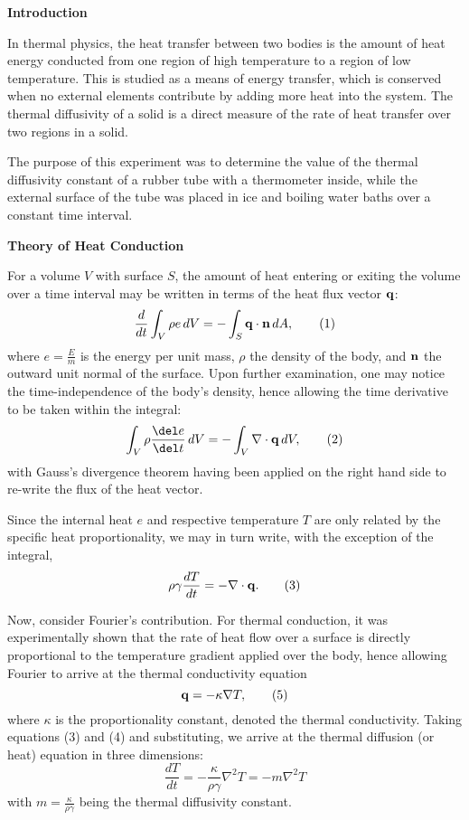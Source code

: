 \documentclass[11pt]{article}
\begin{document}
\begin{multicols}{2}


     \selectfont \textbf{Introduction}
    
     \selectfont 
    
    In thermal physics, the heat transfer between two bodies is the amount of heat energy conducted from one region of high temperature to a region of low temperature. This is studied as a means of energy transfer, which is conserved when no external elements contribute by adding more heat into the system. The thermal diffusivity of a solid is a direct measure of the rate of heat transfer over two regions in a solid.
    
    The purpose of this experiment was to determine the value of the thermal diffusivity constant of a rubber tube with a thermometer inside, while the external surface of the tube was placed in ice and boiling water baths over a constant time interval.  




    \vspace{10pt}

     \selectfont \textbf{Theory of Heat Conduction}
    
     \selectfont 
     

    For a volume $V$ with surface $S$, the amount of heat entering or exiting the volume over a time interval may be written in terms of the heat flux vector ${\bf{q}}$:
    \[
        \frac{d}{dt}\int_V \rho e\, dV = -\int_S {\bf{q}}\cdot {\bf{n}}\, dA,  \tag{1} 
    \]
    \nd where $e = \frac{E}{m}$ is the energy per unit mass, $\rho$ the density of the body, and ${\bf{n}}$ the outward unit normal of the surface. Upon further examination, one may notice the time-independence of the body's density, hence allowing the time derivative to be taken within the integral: 
    \[
        \int_V \rho \frac{\del e}{\del t}\, dV = -\int_V\nabla\cdot {\bf{q}}\, dV,  \tag{2}
    \]
    \nd with Gauss's divergence theorem having been applied on the right hand side to re-write the flux of the heat vector.

    Since the internal heat $e$ and respective temperature $T$ are only related by the specific heat proportionality, we may in turn write, with the exception of the integral, 
    \[
        \rho \gamma \frac{dT}{dt} = -\nabla \cdot {\bf{q}}. \tag{3}  
    \]

    Now, consider Fourier's contribution. For thermal conduction, it was experimentally shown that the rate of heat flow over a surface is directly proportional to the temperature gradient applied over the body, hence allowing Fourier to arrive at the thermal conductivity equation 
    \[
        {\bf{q}} = -\kappa \nabla T, \tag{5}
    \]
    \nd where $\kappa$ is the proportionality constant, denoted the thermal conductivity. Taking equations (3) and (4) and substituting, we arrive at the thermal diffusion (or heat) equation in three dimensions:
    \[
        \frac{dT}{dt} = -\frac{\kappa}{\rho \gamma} \nabla^2 T = -m\nabla^2 T \tag{5}    
    \]
    \nd with $m = \frac{\kappa}{\rho\gamma}$ being the thermal diffusivity constant.


\end{multicols}
\end{document}
